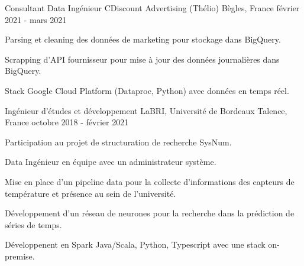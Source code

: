 \begin{cventries}
	\cventry
	{Consultant Data Ingénieur}
	{CDiscount Advertising (Thélio)}
	{Bègles, France}
	{février 2021 - mars 2021}
	{
		\begin{cvitems}
			\item {Parsing et cleaning des données de marketing pour stockage dans BigQuery.}
			\item {Scrapping d'API fournisseur pour mise à jour des données journalières dans BigQuery.}
			\item {Stack Google Cloud Platform (Dataproc, Python) avec données en temps réel.}
		\end{cvitems}
	}
	
	\cventry
	{Ingénieur d'études et développement}
	{LaBRI, Université de Bordeaux}
	{Talence, France}
	{octobre 2018 - février 2021}
	{
		\begin{cvitems}
			\item {Participation au projet de structuration de recherche SysNum.}
			\item {Data Ingénieur en équipe avec un administrateur système.}
			\item {Mise en place d'un pipeline data pour la collecte d'informations des capteurs de température et présence au sein de l'université.}
			\item {Développement d'un réseau de neurones pour la recherche dans la prédiction de séries de temps.}
			\item {Développenent en Spark Java/Scala, Python, Typescript avec une stack on-premise.}
		\end{cvitems}
	}
	
\end{cventries}